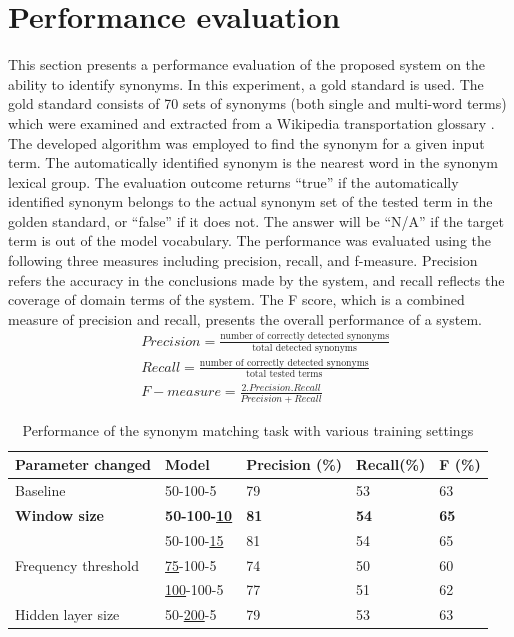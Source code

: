 \documentclass[Journal, BackFigs,NoLists, DoubleSpace]{ascelike}%
\begin{document}
\section{Performance evaluation} \label{sec:eval_RoadLex}
This section presents a performance evaluation of the proposed system on the ability to identify synonyms. In this experiment, a gold standard is used. The gold standard consists of 70 sets of synonyms (both single and multi-word terms) which were examined and extracted from a Wikipedia transportation glossary \cite{wikipedia16}. The developed algorithm was employed to find the synonym for a given input term. The automatically identified synonym is the nearest word in the synonym lexical group. The evaluation outcome returns ``true'' if the automatically identified synonym belongs to the actual synonym set of the tested term in the golden standard, or ``false'' if it does not. The answer will be ``N/A'' if the target term is out of the model vocabulary. The performance was evaluated using the following three measures including precision, recall, and f-measure. Precision refers the accuracy in the conclusions made by the system, and recall reflects the coverage of domain terms of the system. The F score, which is a combined measure of precision and recall, presents the overall performance of a system. 
%
\begin{align} 
&Precision = \frac{\text{number of correctly detected synonyms}}{\text{total detected synonyms}}  \\
&Recall = \frac{\text{number of correctly detected synonyms}}{\text{total tested terms}}  \\ 
&F-measure = \frac{2.Precision.Recall}{Precision+Recall}
\end{align}
\begin{table} [b] 
	\caption{Performance of the synonym matching task with various training settings}
	\label{table:eval_syn_par_effect}
	\centering
	\small
	\renewcommand{\arraystretch}{1.25}
	\begin{tabular}{l l l l l }
		\hline
		\hline
		\textbf{Parameter changed} & \textbf{Model} & \textbf{Precision (\%)}  & \textbf{Recall(\%)} & \textbf{F (\%)}\\
		\hline
		Baseline	&	50-100-5	&79		&53		&63\\
		\hline
		\textbf{Window size}	&\textbf{50-100-\underline{10}}	&\textbf{81}		&\textbf{54}		&\textbf{65}\\
		&50-100-\underline{15}	&81		&54		&65\\
		\hline		
		Frequency threshold	&\underline{75}-100-5	&74		&50		&60\\
		&\underline{100}-100-5	&77		&51		&62\\
		\hline
		Hidden layer size	&50-\underline{200}-5	&79		&53		&63\\
		\hline
		\hline
	\end{tabular}
	\normalsize
\end{table}
\end{document}
